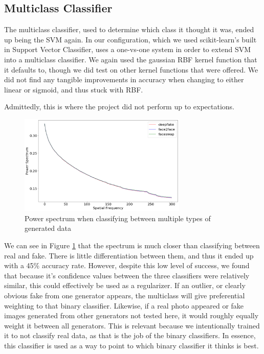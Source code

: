 \documentclass[11pt,twocolumn,letterpaper]{article}
\begin{document}
\subsection{Multiclass Classifier}
The multiclass classifier, used to determine which class it thought it was, ended up being the SVM again. In our configuration, which we used scikit-learn's built in Support Vector Classifier, uses a one-vs-one system in order to extend SVM into a multiclass classifier\cite{Smola04atutorial}\cite{scikitlearnSVC}. We again used the gaussian RBF kernel function that it defaults to, though we did test on other kernel functions that were offered. We did not find any tangible improvements in accuracy when changing to either linear or sigmoid, and thus stuck with RBF.\par
Admittedly, this is where the project did not perform up to expectations.
\begin{figure}%
    \includegraphics[width=8cm]{multiclass-power-spectrum}
    \caption{Power spectrum when classifying between multiple types of generated data}
    \label{fig:mult-power-spectrum}
\end{figure}
We can see in Figure \ref{fig:mult-power-spectrum} that the spectrum is much closer than classifying between real and fake. There is little differentiation between them, and thus it ended up with a 45\% accuracy rate. However, despite this low level of success, we found that because it's confidence values between the three classifiers were relatively similar, this could effectively be used as a regularizer. If an outlier, or clearly obvious fake from one generator appears, the multiclass will give preferential weighting to that binary classifier. Likewise, if a real photo appeared or fake images generated from other generators not tested here, it would roughly equally weight it between all generators. This is relevant because we intentionally trained it to not classify real data, as that is the job of the binary classifiers. In essence, this classifier is used as a way to point to which binary classifier it thinks is best.
\end{document}

